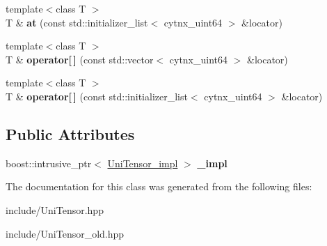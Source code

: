 \begin{DoxyCompactItemize}
{\footnotesize template$<$class T $>$ }\\T \& {\bfseries at} (const std\+::initializer\+\_\+list$<$ cytnx\+\_\+uint64 $>$ \&locator)
\item 
\mbox{\label{classcytnx_1_1UniTensor_a59acdb7ef1794cf3c98d9639989c31c3}} 
{\footnotesize template$<$class T $>$ }\\T \& {\bfseries operator\mbox{[}$\,$\mbox{]}} (const std\+::vector$<$ cytnx\+\_\+uint64 $>$ \&locator)
\item 
\mbox{\label{classcytnx_1_1UniTensor_a017d4d0b8740540838432e909542aa27}} 
{\footnotesize template$<$class T $>$ }\\T \& {\bfseries operator\mbox{[}$\,$\mbox{]}} (const std\+::initializer\+\_\+list$<$ cytnx\+\_\+uint64 $>$ \&locator)
\end{DoxyCompactItemize}
\subsection*{Public Attributes}
\begin{DoxyCompactItemize}
\item 
\mbox{\label{classcytnx_1_1UniTensor_a39de13f941475075a365e98902104f35}} 
boost\+::intrusive\+\_\+ptr$<$ \hyperlink{classcytnx_1_1UniTensor__impl}{Uni\+Tensor\+\_\+impl} $>$ {\bfseries \+\_\+impl}
\end{DoxyCompactItemize}


The documentation for this class was generated from the following files\+:\begin{DoxyCompactItemize}
\item 
include/Uni\+Tensor.\+hpp\item 
include/Uni\+Tensor\+\_\+old.\+hpp\end{DoxyCompactItemize}
